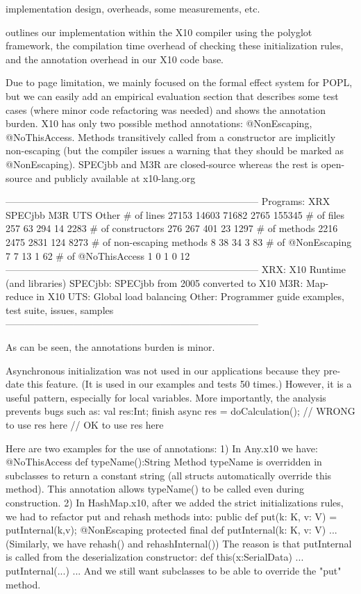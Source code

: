 implementation design, overheads, some measurements, etc.

outlines our implementation within the X10 compiler using the polyglot framework,
    the compilation time overhead of checking these initialization rules,
    and the annotation overhead in our X10 code base.


Due to page limitation, we mainly focused on the formal effect system for POPL,
but we can easily add an empirical evaluation section that describes some test cases (where minor code refactoring was needed) and shows the annotation burden.
X10 has only two possible method annotations: @NonEscaping, @NoThisAccess.
Methods transitively called from a constructor are implicitly non-escaping (but the compiler issues a warning that they should be marked as @NonEscaping).
SPECjbb and M3R are closed-source whereas the rest is open-source and publicly available at x10-lang.org

------------------------------------------------------------------------------
Programs:           XRX SPECjbb     M3R UTS Other
\# of lines          27153   14603       71682   2765    155345
\# of files          257 63      294 14  2283
\# of constructors       276 267     401 23  1297
\# of methods            2216    2475        2831    124 8273
\# of non-escaping methods   8   38      34  3   83
\# of @NonEscaping       7   7       13  1   62
\# of @NoThisAccess      1   0       1   0   12
------------------------------------------------------------------------------
XRX: X10 Runtime (and libraries)
SPECjbb: SPECjbb from 2005 converted to X10
M3R: Map-reduce in X10
UTS: Global load balancing
Other: Programmer guide examples, test suite, issues, samples
------------------------------------------------------------------------------

As can be seen, the annotations burden is minor.

Asynchronous initialization was not used in our applications because they pre-date this feature.
(It is used in our examples and tests 50 times.)
However, it is a useful pattern, especially for local variables.
More importantly, the analysis prevents bugs such as:
val res:Int;
finish {
  async {
    res = doCalculation();
  }
  // WRONG to use res here
}
// OK to use res here

Here are two examples for the use of annotations:
1) In Any.x10 we have:
@NoThisAccess def typeName():String
Method typeName is overridden in subclasses to return a constant string (all structs automatically override this method).
This annotation allows typeName() to be called even during construction.
2) In HashMap.x10, after we added the strict initializations rules, we had to refactor put and rehash methods into:
public def put(k: K, v: V) = putInternal(k,v);
@NonEscaping protected final def putInternal(k: K, v: V) {...}
(Similarly, we have rehash() and rehashInternal())
The reason is that putInternal is called from the deserialization constructor:
def this(x:SerialData) { ... putInternal(...) ... }
And we still want subclasses to be able to override the "put" method.



